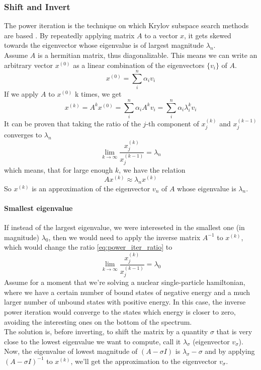 \subsubsection{Shift and Invert}
The power iteration is the technique on which Krylov subspace search methods are based \cite{golub13}. By repeatedly applying matrix $A$ to a vector $x$, it gets skewed towards the eigenvector whose eigenvalue is of largest magnitude $\lambda_n$.
\\Assume $A$ is a hermitian matrix, thus diagonalizable. This means we can write an arbitrary vector $x^{(0)}$ as a linear combination of the eigenvectors $\{v_i\}$ of $A$.
\begin{equation}
    x^{(0)} = \sum_i^n \alpha_i v_i
\end{equation}
If we apply $A$ to $x^{(0)}$ k times, we get
\begin{equation}
    x^{(k)} = A^k x^{(0)} = \sum_i^n \alpha_i A^k v_i = \sum_i^n \alpha_i\lambda_i ^{k}v_i
\end{equation}
It can be proven that taking the ratio of the $j$-th component of $x_j^{(k)}$ and $x_j^{(k-1)}$ converges to $\lambda_n$
\begin{equation}
    \label{eq:power_iter_ratio}
    \lim_{k\to\infty} \frac{x_j^{(k)}}{x_j^{(k-1)}} = \lambda_n
\end{equation}
which means, that for large enough $k$, we have the relation
\begin{equation}
    \label{eq:power_iter_lambda}
    A x^{(k)} \approx \lambda_n x^{(k)}
\end{equation}
So $x^{(k)}$ is an approximation of the eigenvector $v_n$ of $A$ whose eigenvalue is $\lambda_n$.
\paragraph{Smallest eigenvalue}
If instead of the largest eigenvalue, we were intereseted in the smallest one (in magnitude) $\lambda_0$, then we would need to apply the inverse matrix $A^{-1}$ to $x^{(k)}$, which would change the ratio \ref{eq:power_iter_ratio} to 
\begin{equation}
    \label{eq:power_iter_ratio_inv}
    \lim_{k\to\infty} \frac{x_j^{(k)}}{x_j^{(k-1)}} = \lambda_0
\end{equation}
Assume for a moment that we're solving a nuclear single-particle hamiltonian, where we have a certain number of bound states of negative energy and a much larger number of unbound states with positive energy. In this case, the inverse power iteration would converge to the states which energy is closer to zero, avoiding the interesting ones on the bottom of the spectrum.
\\The solution is, before inverting, to shift the matrix by a quantity $\sigma$ that is very close to the lowest eigenvalue we want to compute, call it $\lambda_\sigma$ (eigenvector $v_\sigma$).
Now, the eigenvalue of lowest magnitude of $(A-\sigma I)$ is $\lambda_\sigma - \sigma$ and by applying $(A-\sigma I)^{-1}$ to $x^{(k)}$, we'll get the approximation to the eigenvector $v_\sigma$.
